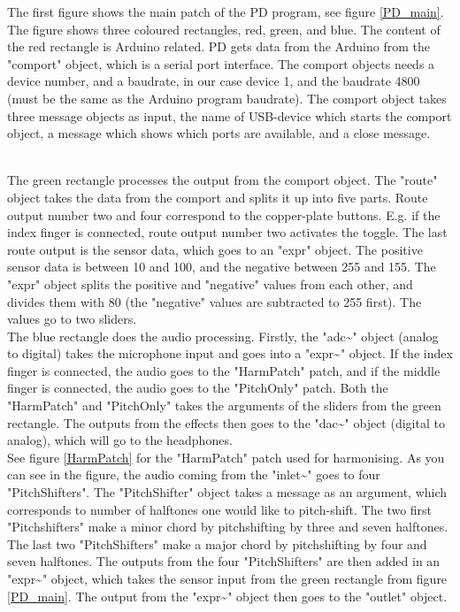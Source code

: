 The first figure shows the main patch of the PD program, see figure \ref{PD_main}. The figure shows three coloured rectangles, red, green, and blue. 
The content of the red rectangle is Arduino related. PD gets data from the Arduino from the "comport" object, which is a serial port interface. 
The comport objects needs a device number, and a baudrate, in our case device 1, and the baudrate 4800 (must be the same as the Arduino program baudrate). The comport object takes three message objects as input, the name of USB-device which starts the comport object, a message which shows which ports are available, and a close message.   \\

\begin{minipage}{\linewidth}%
\label{PD_main}
\end{minipage}\\

The green rectangle processes the output from the comport object. The "route" object takes the data from the comport and splits it up into five parts. 
Route output number two and four correspond to the copper-plate buttons. E.g. if the index finger is connected, route output number two activates the toggle. 
The last route output is the sensor data, which goes to an "expr" object. The positive sensor data is between 10 and 100, and the negative between 255 and 155. 
The "expr" object splits the positive and "negative" values from each other, and divides them with 80 (the "negative" values are subtracted to 255 first). 
The values go to two sliders.\\

The blue rectangle does the audio processing. Firstly, the "adc\textasciitilde" object (analog to digital) takes the microphone input and goes into a "expr\textasciitilde" object. If the index finger is connected, 
the audio goes to the "HarmPatch" patch, and if the middle finger is connected, the audio goes to the "PitchOnly" patch. Both the "HarmPatch" and "PitchOnly" takes 
the arguments of the sliders from the green rectangle. The outputs from the effects then goes to the "dac\textasciitilde" object (digital to analog), which will go to the headphones.\\

See figure \ref{HarmPatch} for the "HarmPatch" patch used for harmonising. As you can see in the figure, the audio coming from the "inlet\textasciitilde" goes to four "PitchShifters". The "PitchShifter" object
takes a message as an argument, which corresponds to number of halftones one would like to pitch-shift. The two first "Pitchshifters" make a minor chord by pitchshifting by three and seven halftones.  The last two "PitchShifters" make a major chord by pitchshifting by four and seven halftones. The outputs from the four "PitchShifters" are then added in an "expr\textasciitilde" object, which takes the
sensor input from the green rectangle from figure \ref{PD_main}. The output from the "expr\textasciitilde" object then goes to the "outlet" object.
 
